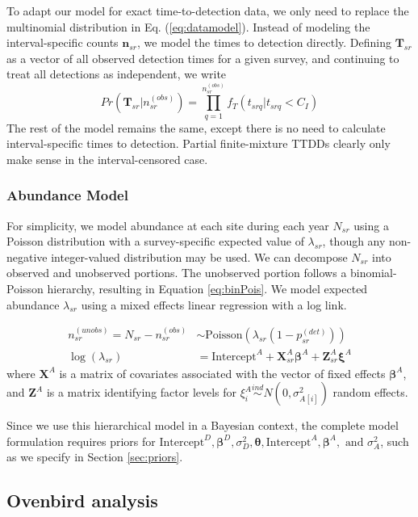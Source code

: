 \documentclass[useAMS,usenatbib,referee,12pt]{article}
\begin{document}
To adapt our model for exact time-to-detection data, we only need to replace the multinomial distribution in Eq. (\ref{eq:datamodel}).  Instead of modeling the interval-specific counts $\textbf{n}_{sr}$, we model the times to detection directly.  Defining $\textbf{T}_{sr}$ as a vector of all observed detection times for a given survey, and continuing to treat all detections as independent, we write
\[
Pr\left(\textbf{T}_{sr}|n_{sr}^{(obs)}\right) = \prod\limits_{q=1}^{n_{sr}^{(obs)}} f_T(t_{srq}|t_{srq}<C_I)
\]
The rest of the model remains the same, except there is no need to calculate interval-specific times to detection.  Partial finite-mixture TTDDs clearly only make sense in the interval-censored case.




\subsubsection{Abundance Model}
For simplicity, we model abundance at each site during each year $N_{sr}$ using a Poisson distribution with a survey-specific expected value of $\lambda_{sr}$, though any non-negative integer-valued distribution may be used.  We can decompose $N_{sr}$ into observed and unobserved portions.  The unobserved portion follows a binomial-Poisson hierarchy, resulting in Equation \ref{eq:binPois}.  We model expected abundance $\lambda_{sr}$ using a mixed effects linear regression with a log link.

\begin{align}
\label{eq:binPois} n_{sr}^{(unobs)} = N_{sr} - n_{sr}^{(obs)} &\sim \mbox{Poisson}\left(\lambda_{sr}(1-p_{sr}^{(det)})\right)\\
\log (\lambda_{sr}) &= \text{Intercept}^A + \textbf{X}_{sr}^A\boldsymbol{\beta}^A + \textbf{Z}_{sr}^A\boldsymbol{\xi}^A
\end{align}
where $\textbf{X}^A$ is a matrix of covariates associated with the vector of fixed effects $\boldsymbol{\beta}^A$, and $\textbf{Z}^A$ is a matrix identifying factor levels for $\xi_i^A \overset{ind}{\sim} N(0,\sigma_{A[i]}^2)$ random effects. 

Since we use this hierarchical model in a Bayesian context, the complete model formulation requires priors for $\text{Intercept}^D, \boldsymbol{\beta}^D, \sigma_{D}^2, \boldsymbol{\theta}, \text{Intercept}^A, \boldsymbol{\beta}^A, \text{ and } \sigma_{A}^2$, such as we specify in Section \ref{sec:priors}.




\subsection{Ovenbird analysis}\label{sec:ovenbirdanalysis}
\end{document}
